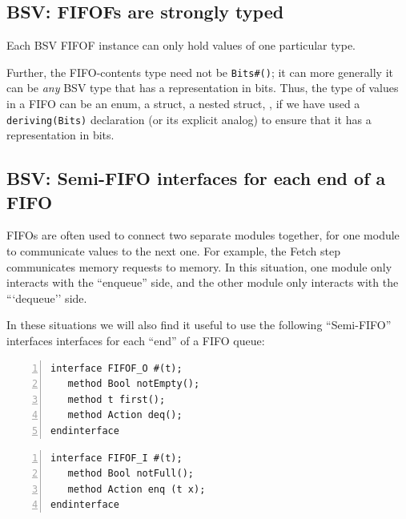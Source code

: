
\subsection{BSV: FIFOFs are strongly typed}


Each BSV FIFOF instance can only hold values of one particular type.

Further, the FIFO-contents type need not be \verb|Bits#()|; it can
more generally it can be \emph{any} BSV type that has a representation
in bits.  Thus, the type of values in a FIFO can be an enum, a struct,
a nested struct, {\etc}, if we have used a \verb|deriving(Bits)|
declaration (or its explicit analog) to ensure that it has a
representation in bits.


\subsection{BSV: Semi-FIFO interfaces for each end of a FIFO}

FIFOs are often used to connect two separate modules together, for one
module to communicate values to the next one.  For example, the Fetch
step communicates memory requests to memory.  In this situation, one
module only interacts with the ``enqueue'' side, and the other module
only interacts with the ```dequeue'' side.

In these situations we will also find it useful to use the following
``Semi-FIFO'' interfaces interfaces for each ``end'' of a FIFO queue:


\begin{Verbatim}[frame=single, numbers=left]
interface FIFOF_O #(t);
   method Bool notEmpty();
   method t first();
   method Action deq();
endinterface
\end{Verbatim}


\begin{Verbatim}[frame=single, numbers=left]
interface FIFOF_I #(t);
   method Bool notFull();
   method Action enq (t x);
endinterface
\end{Verbatim}

